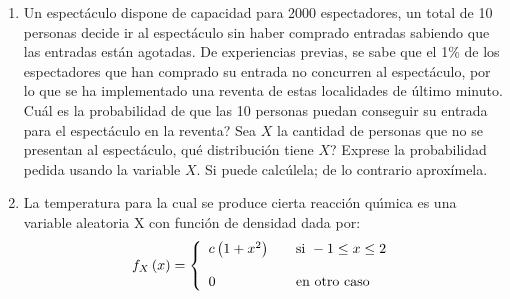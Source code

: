 \documentclass[11pt,a4paper,twoside]{article}%
\begin{document}
\begin{enumerate}
\item Un espect\'{a}culo dispone de capacidad para 2000 espectadores, un total de 10 personas decide ir al espect\'{a}culo sin haber comprado entradas sabiendo que las entradas est\'an agotadas. De experiencias previas, se sabe que el 1\% de los espectadores que
han comprado su entrada no concurren al espect\'{a}culo, por lo que se ha
implementado una reventa de estas localidades de \'{u}ltimo minuto.
\textquestiondown Cu\'{a}l es la probabilidad de que las 10 personas puedan conseguir su entrada para el espect\'{a}culo en la reventa? Sea $X$ la cantidad de personas que no se presentan al
espect\'{a}culo, \textquestiondown qu\'{e} distribuci\'{o}n tiene $X$? Exprese
la probabilidad pedida usando la variable $X$. Si puede calc\'{u}lela; de lo contrario aprox\'imela.




\item La temperatura para la cual se produce cierta reacci\'{o}n qu\'{\i}mica
es una variable aleatoria X con funci\'{o}n de densidad dada por:%
\[
f_{X}\left(  x\right)  =\left\{
\begin{array}
[c]{lll}%
c\left(  1+x^{2}\right)  &  & \text{si }-1\leq x\leq2\\
&  & \\
0 &  & \text{en otro caso}%
\end{array}
\right.
\]



\end{enumerate}
\end{document}
